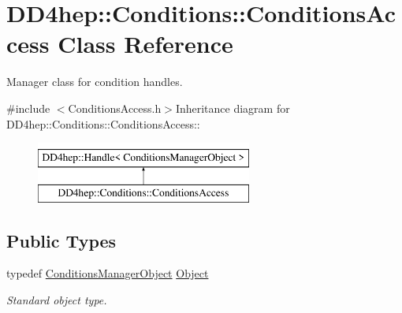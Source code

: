 \hypertarget{class_d_d4hep_1_1_conditions_1_1_conditions_access}{
\section{DD4hep::Conditions::ConditionsAccess Class Reference}
\label{class_d_d4hep_1_1_conditions_1_1_conditions_access}
}


Manager class for condition handles.  


{\ttfamily \#include $<$ConditionsAccess.h$>$}Inheritance diagram for DD4hep::Conditions::ConditionsAccess::\begin{figure}[H]
\begin{center}
\leavevmode
\includegraphics[height=2cm]{class_d_d4hep_1_1_conditions_1_1_conditions_access}
\end{center}
\end{figure}
\subsection*{Public Types}
\begin{DoxyCompactItemize}
\item 
typedef \hyperlink{class_d_d4hep_1_1_conditions_1_1_conditions_manager_object}{ConditionsManagerObject} \hyperlink{class_d_d4hep_1_1_conditions_1_1_conditions_access_a5d82a416d51349abaf6075b2028faecc}{Object}
\begin{DoxyCompactList}\small\item\em Standard object type. \item\end{DoxyCompactList}\end{DoxyCompactItemize}
